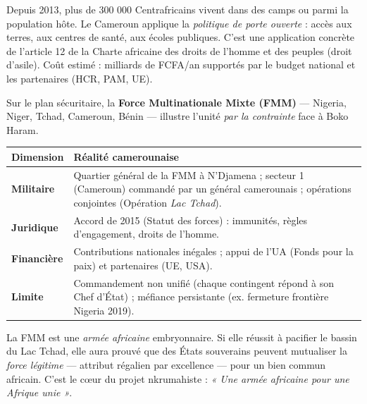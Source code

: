 \documentclass[11pt]{article}
\begin{document}
\begin{exemplebox}
Depuis 2013, plus de 300 000 Centrafricains vivent dans des camps ou parmi la population hôte. Le Cameroun applique la \emph{politique de porte ouverte} : accès aux terres, aux centres de santé, aux écoles publiques. C'est une application concrète de l'article 12 de la Charte africaine des droits de l'homme et des peuples (droit d'asile). Coût estimé : milliards de FCFA/an supportés par le budget national et les partenaires (HCR, PAM, UE).
\end{exemplebox}

Sur le plan sécuritaire, la \textbf{Force Multinationale Mixte (FMM)} — Nigeria, Niger, Tchad, Cameroun, Bénin — illustre l'unité \emph{par la contrainte} face à Boko Haram.

\begin{center}
\begin{tabularx}{\linewidth}{|l|X|}\hline
\rowcolor{popblueL}
\textbf{Dimension} & \textbf{Réalité camerounaise} \\ \hline
\textbf{Militaire} & Quartier général de la FMM à N'Djamena ; secteur 1 (Cameroun) commandé par un général camerounais ; opérations conjointes (Opération \emph{Lac Tchad}). \\ \hline
\textbf{Juridique} & Accord de 2015 (Statut des forces) : immunités, règles d'engagement, droits de l'homme. \\ \hline
\textbf{Financière} & Contributions nationales inégales ; appui de l'UA (Fonds pour la paix) et partenaires (UE, USA). \\ \hline
\textbf{Limite} & Commandement non unifié (chaque contingent répond à son Chef d'État) ; méfiance persistante (ex. fermeture frontière Nigeria 2019). \\ \hline
\end{tabularx}
\end{center}

\begin{aretenir}
La FMM est une \emph{armée africaine} embryonnaire. Si elle réussit à pacifier le bassin du Lac Tchad, elle aura prouvé que des États souverains peuvent mutualiser la \emph{force légitime} — attribut régalien par excellence — pour un bien commun africain. C'est le cœur du projet nkrumahiste : \emph{« Une armée africaine pour une Afrique unie »}.
\end{aretenir}
\end{document}
